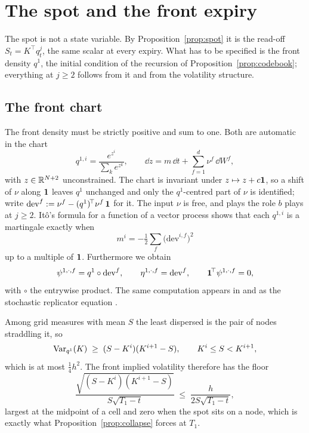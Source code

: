 \section{The spot and the front expiry}\label{sec:front}

The spot is not a state variable. By Proposition~\ref{prop:spot} it is the read-off
$S_t=K^{\!\top}q^j_t$, the same scalar at every expiry. What has to be specified is
the front density $q^{1}$, the initial condition of the recursion of
Proposition~\ref{prop:codebook}; everything at $j\ge2$ follows from it and from the
volatility structure.

\subsection{The front chart}\label{sec:frontslice}

The front density must be strictly positive and sum to one. Both are automatic in the
chart
\begin{equation}\label{eq:softmax}
  q^{1,i}=\frac{e^{z^i}}{\sum_ke^{z^k}},\qquad
  \dd z=m\,\dd t+\sum_{f=1}^{d}\nu^f\,\dd W^f ,
\end{equation}
with $z\in\mathbb R^{N+2}$ unconstrained. The chart is invariant under $z\mapsto z+c\mathbf 1$, so a
shift of $\nu$ along $\mathbf 1$ leaves $q^1$ unchanged and only the $q^1$-centred part of
$\nu$ is identified; write $\mathrm{dev}^f:=\nu^f-(q^1)^{\!\top}\nu^f\,\mathbf 1$ for it. The input
$\nu$ is free, and plays the role $b$ plays at $j\ge2$. It\^o's formula for a function
of a vector process shows that each $q^{1,i}$ is a martingale exactly when
\begin{equation}\label{eq:frontdrift}
  m^i=-\tfrac12\sum_f\bigl(\mathrm{dev}^{i,f}\bigr)^2
\end{equation}
up to a multiple of $\mathbf 1$. Furthermore we obtain
\begin{equation}\label{eq:psi1}
  \psi^{1,\cdot,f}=q^1\circ\mathrm{dev}^f,
  \qquad
  \eta^{1,\cdot,f}=\mathrm{dev}^f,
  \qquad
  \mathbf 1^{\!\top}\psi^{1,\cdot,f}=0 ,
\end{equation}
with $\circ$ the entrywise product.
The same computation appears in \cite{FilipovicHughstonMacrina2012} and as the
stochastic replicator equation \cite{MertikopoulosMoustakas2010}.

\begin{remark}\label{rem:frontres}
Among grid measures with mean $S$ the least dispersed is the pair of nodes straddling
it, so
\begin{equation}\label{eq:varfloor}
  \operatorname{Var}_{q^1}(K)\;\ge\;(S-K^i)(K^{i+1}-S),
  \qquad K^i\le S<K^{i+1},
\end{equation}
which is at most $\tfrac14h^{2}$. The front implied volatility therefore has the floor
\[
  \frac{\sqrt{(S-K^i)(K^{i+1}-S)}}{S\sqrt{T_1-t}}\;\le\;\frac{h}{2S\sqrt{T_1-t}},
\]
largest at the midpoint of a cell and zero when the spot sits on a node, which is
exactly what Proposition~\ref{prop:collapse} forces at $T_1$.
\end{remark}

